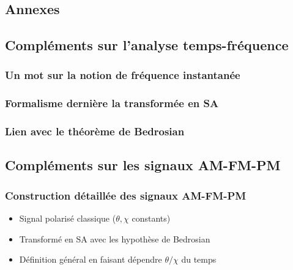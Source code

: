 


\begin{annexe}

\section{Annexes}

\subsection{Compléments sur l'analyse temps-fréquence}\label{ann:complement_t-f}

\subsubsection{Un mot sur la notion de fréquence instantanée }\label{ann:freq_instant}

\subsubsection{Formalisme dernière la transformée en SA}\label{ann:transfo_SA}

\subsubsection{Lien avec le théorème de Bedrosian}\label{ann:bedrosian}

\subsection{Compléments sur les signaux AM-FM-PM}\label{ann:AM-FM-PM}

\subsubsection{Construction détaillée des signaux AM-FM-PM }\label{ann:construc_AM-FM-PM}

\begin{itemize}
	
	\item Signal polarisé classique ($\theta,\chi$ constants)
	
	\item Transformé en SA avec les hypothèse de Bedrosian 
	
	\item Définition général en faisant dépendre $\theta / \chi$ du temps
	

\end{itemize}
\end{annexe}
